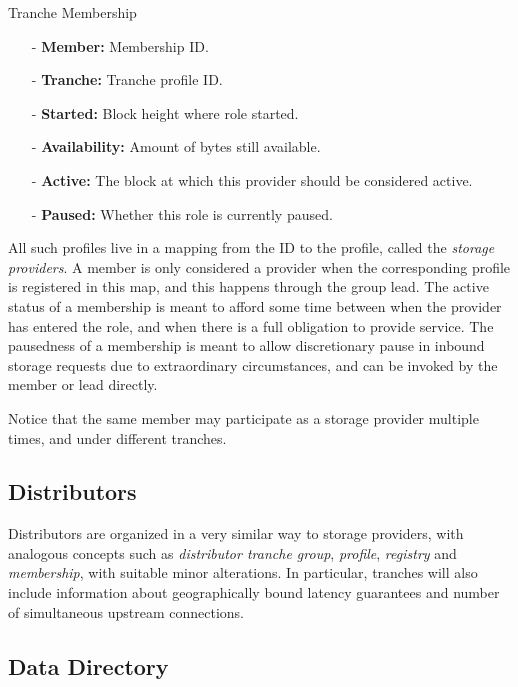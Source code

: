 \documentclass{article}
\newenvironment{concept_box}[1]
    {
    \begin{tcolorbox}
    {\large \textbf{#1} }
    }
    {
    \end{tcolorbox}
    }
\begin{document}
\begin{concept_box}{Tranche Membership}
    \begin{itemize}
      \item[-] \textbf{Member:} Membership ID.
      \item[-] \textbf{Tranche:} Tranche profile ID.
      \item[-] \textbf{Started:} Block height where role started.
      \item[-] \textbf{Availability:} Amount of bytes still available.
      \item[-] \textbf{Active:} The block at which this provider should be considered active.
      \item[-] \textbf{Paused:} Whether this role is currently paused.
    \end{itemize}
\end{concept_box}

All such profiles live in a mapping from the ID to the profile, called the \textit{storage providers}. A member is only considered a provider when the corresponding profile is registered in this map, and this happens through the group lead. The active status of a membership is meant to afford some time between when the provider has entered the role, and when there is a full obligation to provide service. The pausedness of a membership is meant to allow discretionary pause in inbound storage requests due to extraordinary circumstances, and can be invoked by the member or lead directly.

Notice that the same member may participate as a storage provider multiple times, and under different tranches.

\subsection{Distributors}

Distributors are organized in a very similar way to storage providers, with analogous concepts such as \textit{distributor tranche group}, \textit{profile},  \textit{registry} and \textit{membership}, with suitable minor alterations. In particular, tranches will also include information about geographically bound latency guarantees and number of simultaneous upstream connections.

\subsection{Data Directory}
\end{document}
